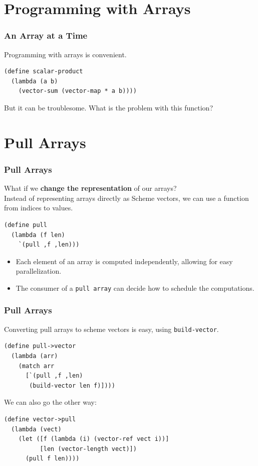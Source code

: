 \documentclass[12pt,letterpaper]{beamer}
\begin{document}
\section{Programming with Arrays}

\begin{frame}[fragile]
\frametitle{An Array at a Time}
Programming with arrays is convenient.
\begin{lstlisting}
(define scalar-product
  (lambda (a b)
    (vector-sum (vector-map * a b))))
\end{lstlisting}
But it can be troublesome. What is the problem with this
function?
\end{frame}

\section{Pull Arrays}

\begin{frame}[fragile]
\frametitle{Pull Arrays}
What if we \textbf{change the representation} of our arrays? \\
Instead of representing arrays directly as Scheme vectors, we can use a function from indices to values.
\begin{lstlisting}
(define pull
  (lambda (f len) 
    `(pull ,f ,len)))
\end{lstlisting}
  \begin{itemize}
  \item Each element of an array is computed independently, allowing for easy
    parallelization.
  \item The consumer of a {\tt pull array} can decide how to schedule the computations.
  \end{itemize}
\end{frame}

\begin{frame}[fragile]
\frametitle{Pull Arrays}
Converting pull arrays to scheme vectors is easy, using {\tt build-vector}. 
\begin{lstlisting}
(define pull->vector
  (lambda (arr)
    (match arr
      [`(pull ,f ,len)
       (build-vector len f)])))
\end{lstlisting}
We can also go the other way:
\begin{lstlisting}
(define vector->pull
  (lambda (vect) 
    (let ([f (lambda (i) (vector-ref vect i))]
          [len (vector-length vect)])
      (pull f len))))
\end{lstlisting}
\end{frame}
\end{document}
